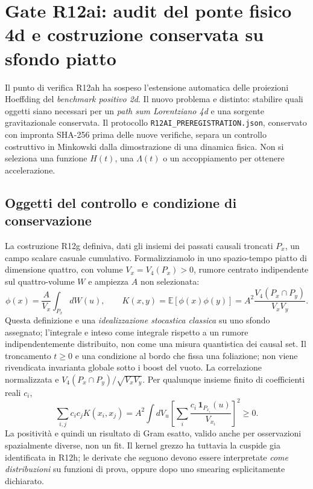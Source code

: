 \documentclass[11pt,a4paper]{article}
\begin{document}
\section{Gate R12ai: audit del ponte fisico 4d e costruzione conservata su sfondo piatto}
\label{sec:r12ai}

Il punto di verifica R12ah ha sospeso l'estensione automatica delle proiezioni Hoeffding del \emph{benchmark positivo 2d}. Il nuovo problema e distinto: stabilire quali oggetti siano necessari per un \emph{path sum Lorentziano 4d} e una sorgente gravitazionale conservata. Il protocollo \texttt{R12AI\_PREREGISTRATION.json}, conservato con impronta SHA-256 prima delle nuove verifiche, separa un controllo costruttivo in Minkowski dalla dimostrazione di una dinamica fisica. Non si seleziona una funzione $H(t)$, una $\Lambda(t)$ o un accoppiamento per ottenere accelerazione.

\subsection{Oggetti del controllo e condizione di conservazione}

La costruzione R12g definiva, dati gli insiemi dei passati causali troncati $P_x$, un campo scalare casuale cumulativo. Formalizziamolo in uno spazio-tempo piatto di dimensione quattro, con volume $V_x=V_4(P_x)>0$, rumore centrato indipendente sul quattro-volume $W$ e ampiezza $A$ non selezionata:
\begin{equation}
 \phi(x)=\frac{A}{V_x}\int_{P_x}\!dW(u),\qquad
 K(x,y)=\mathbb E[\phi(x)\phi(y)]
 =A^2\frac{V_4(P_x\cap P_y)}{V_xV_y}.
 \label{eq:r12ai_overlap_K}
\end{equation}
Questa definizione e una \emph{idealizzazione stocastica classica} su uno sfondo assegnato; l'integrale e inteso come integrale rispetto a un rumore indipendentemente distribuito, non come una misura quantistica dei causal set. Il troncamento $t\ge0$ e una condizione al bordo che fissa una foliazione; non viene rivendicata invarianta globale sotto i boost del vuoto. La correlazione normalizzata e $V_4(P_x\cap P_y)/\sqrt{V_xV_y}$. Per qualunque insieme finito di coefficienti reali $c_i$,
\begin{equation}
 \sum_{i,j}c_ic_jK(x_i,x_j)
 =A^2\int dV_u\left[\sum_i\frac{c_i\,\mathbf1_{P_{x_i}}(u)}{V_{x_i}}\right]^2\!\ge0.
 \label{eq:r12ai_psd_overlap}
\end{equation}
La positivit\`a e quindi un risultato di Gram esatto, valido anche per osservazioni spazialmente diverse, non un fit. Il kernel grezzo ha tuttavia la cuspide gia identificata in R12h; le derivate che seguono devono essere interpretate \emph{come distribuzioni} su funzioni di prova, oppure dopo uno smearing esplicitamente dichiarato.
\end{document}
